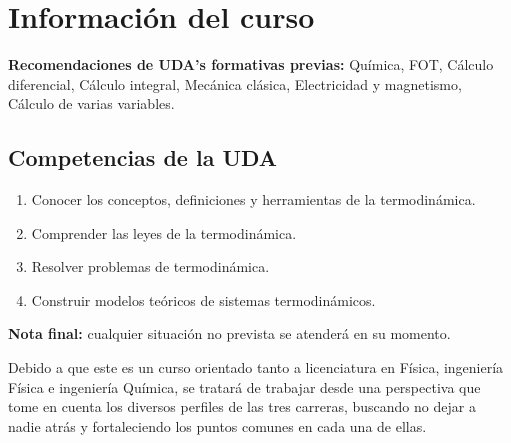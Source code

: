 \chapter*{Información del curso}

\textbf{Recomendaciones de UDA's formativas previas:} Química, FOT, Cálculo diferencial,
Cálculo integral, Mecánica clásica, Electricidad y magnetismo, Cálculo de varias variables.

\section*{Competencias de la UDA}
\begin{enumerate}[label=\arabic*.,leftmargin=1.5em,itemsep=1pt]
  \item Conocer los conceptos, definiciones y herramientas de la termodinámica.
  \item Comprender las leyes de la termodinámica.
  \item Resolver problemas de termodinámica.
  \item Construir modelos teóricos de sistemas termodinámicos.
\end{enumerate}

\textbf{Nota final:} cualquier situación no prevista se atenderá en su momento.

Debido a que este es un curso orientado tanto a licenciatura en Física, ingeniería Física
e ingeniería Química, se tratará de trabajar desde una perspectiva que tome en cuenta los
diversos perfiles de las tres carreras, buscando no dejar a nadie atrás y fortaleciendo
los puntos comunes en cada una de ellas.
